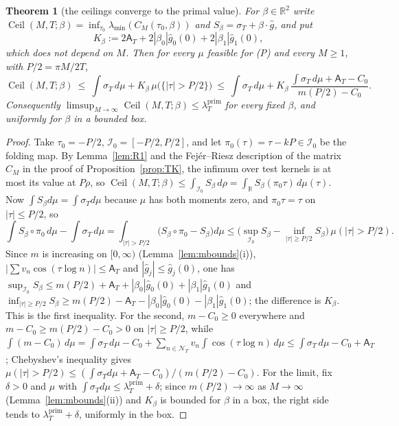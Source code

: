 \documentclass[11pt]{amsart}
\newtheorem{theorem}{Theorem}[section]
\theoremstyle{definition}
\theoremstyle{remark}
\newcommand{\R}{\mathbb R}
\newcommand{\lamP}{\lambda^{\mathrm{prim}}_T}
\newcommand{\sT}{\sigma_T}
\newcommand{\gh}[1]{\widehat g_{#1}}
\newcommand{\NT}{\mathcal N_T}
\newcommand{\Aconst}{\mathsf A_T}
\begin{document}
\begin{theorem}[the ceilings converge to the primal value]\label{thm:R}
For $\beta\in\R^2$ write $\operatorname{Ceil}(M,T;\beta)=\inf_{\tau_0}\lambda_{\min}(C_M(\tau_0,\beta))$
and $S_\beta=\sT+\beta\cdot\widehat g$, and put
\[
K_\beta:=2\Aconst+2|\beta_0|\gh0(0)+2|\beta_1|\gh1(0),
\]
which does not depend on $M$. Then for every $\mu$ feasible for \textup{(P)} and every $M\ge1$,
with $P/2=\pi M/2T$,
\[
\operatorname{Ceil}(M,T;\beta)\ \le\ \int\sT\,d\mu+K_\beta\,\mu\big(\{|\tau|>P/2\}\big)
\ \le\ \int\sT\,d\mu+K_\beta\,\frac{\int\sT\,d\mu+\Aconst-C_0}{m(P/2)-C_0}.
\]
Consequently $\limsup_{M\to\infty}\operatorname{Ceil}(M,T;\beta)\le\lamP$ for
every fixed $\beta$, and uniformly for $\beta$ in a bounded box.
\end{theorem}
\begin{proof}
Take $\tau_0=-P/2$, $\mathcal I_0=[-P/2,P/2]$, and let $\pi_0(\tau)=\tau-kP\in\mathcal I_0$ be the folding map. By
Lemma~\ref{lem:R1} and the Fej\'er--Riesz description of the matrix $C_M$ in the proof of
Proposition~\ref{prop:TK}, the infimum over test kernels is at most its value at $P\rho$, so
$\operatorname{Ceil}(M,T;\beta)\le\int_{\mathcal I_0}S_\beta\,d\rho=\int_\R S_\beta(\pi_0\tau)\,d\mu(\tau)$. Now
$\int S_\beta d\mu=\int\sT d\mu$ because $\mu$ has both moments zero, and $\pi_0\tau=\tau$ on
$|\tau|\le P/2$, so
\[
\int S_\beta\circ\pi_0\,d\mu-\int\sT\,d\mu=\int_{|\tau|>P/2}\big(S_\beta\circ\pi_0-S_\beta\big)d\mu
\le\Big(\sup_{\mathcal I_0}S_\beta-\inf_{|\tau|\ge P/2}S_\beta\Big)\,\mu(|\tau|>P/2).
\]
Since $m$ is increasing on $[0,\infty)$ (Lemma~\ref{lem:mbounds}(i)), $|\sum v_n\cos(\tau\log n)|\le\Aconst$ and
$|\gh j|\le\gh j(0)$, one has $\sup_{\mathcal I_0}S_\beta\le m(P/2)+\Aconst+|\beta_0|\gh0(0)+|\beta_1|\gh1(0)$ and
$\inf_{|\tau|\ge P/2}S_\beta\ge m(P/2)-\Aconst-|\beta_0|\gh0(0)-|\beta_1|\gh1(0)$; the difference is $K_\beta$.
This is the first inequality. For the second, $m-C_0\ge0$ everywhere and $m-C_0\ge m(P/2)-C_0>0$ on
$|\tau|\ge P/2$, while $\int(m-C_0)\,d\mu=\int\sT\,d\mu-C_0+\sum_{n\in\NT}v_n\int\cos(\tau\log n)\,d\mu\le\int\sT\,d\mu-C_0+\Aconst$;
Chebyshev's inequality gives $\mu(|\tau|>P/2)\le(\int\sT d\mu+\Aconst-C_0)/(m(P/2)-C_0)$. For the limit, fix
$\delta>0$ and $\mu$ with $\int\sT d\mu\le\lamP+\delta$; since $m(P/2)\to\infty$ as $M\to\infty$
(Lemma~\ref{lem:mbounds}(ii)) and $K_\beta$ is bounded for $\beta$ in a box, the right side tends to
$\lamP+\delta$, uniformly in the box.
\end{proof}
\end{document}
